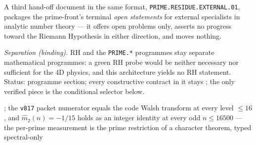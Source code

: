   A third
hand-off document in the same format, \texttt{PRIME.RESIDUE.EXTERNAL.01}, packages the
prime-front's terminal \emph{open statements} for external specialists in analytic number theory
--- it offers open problems only, asserts no progress toward the Riemann Hypothesis in either
direction, and moves nothing.


\par\smallskip\noindent\emph{Separation (binding).}  RH and the \texttt{PRIME.*} programmes stay
separate mathematical programmes: a green RH probe would be neither necessary nor sufficient for
the 4D physics, and this architecture yields no RH statement.  Status: programme section; every
constructive contract in it stays \mO; the only verified piece is the conditional selector
below.

; the \texttt{v817} packet numerator equals the
code Walsh transform at every level $\le 16$, and
$\hat m_2(n) = -1/15$ holds as an integer identity at every odd
$n \le 16500$ --- the per-prime measurement is the prime
restriction of a character theorem, typed spectral-only

